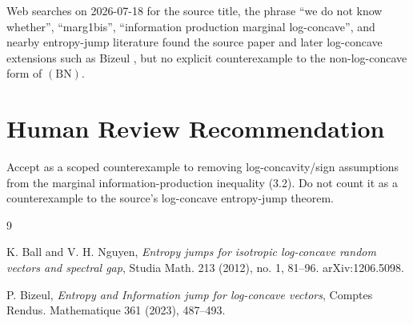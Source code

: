 \documentclass[11pt]{article}
\begin{document}
Web searches on 2026-07-18 for the source title, the phrase ``we do not know
whether'', ``marg1bis'', ``information production marginal log-concave'', and
nearby entropy-jump literature found the source paper and later log-concave
extensions such as Bizeul \cite{Bizeul2023}, but no explicit counterexample to
the non-log-concave form of \((\mathrm{BN})\).

\section*{Human Review Recommendation}

Accept as a scoped counterexample to removing log-concavity/sign assumptions
from the marginal information-production inequality (3.2).  Do not count it as
a counterexample to the source's log-concave entropy-jump theorem.

\begin{thebibliography}{9}

K. Ball and V. H. Nguyen,
\emph{Entropy jumps for isotropic log-concave random vectors and spectral gap},
Studia Math. 213 (2012), no. 1, 81--96.  arXiv:1206.5098.

P. Bizeul,
\emph{Entropy and Information jump for log-concave vectors},
Comptes Rendus. Mathematique 361 (2023), 487--493.

\end{thebibliography}
\end{document}
